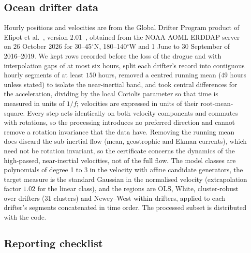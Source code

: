 \subsection{Ocean drifter data}
\label{sec:driftermethods}

Hourly positions and velocities are from the Global Drifter Program product of
Elipot et al.~\citep{elipot2016global}, version 2.01~\citep{elipot2022hourly}, obtained from
the NOAA AOML ERDDAP server on 26 October 2026 for 30--45$^\circ$N,
180--140$^\circ$W and 1 June to 30 September of 2016--2019. We kept rows
recorded before the loss of the drogue and with interpolation gaps of at most
six hours, split each drifter's record into contiguous hourly segments of at
least $150$ hours, removed a centred running mean ($49$ hours unless stated) to
isolate the near-inertial band, and took central differences for the
acceleration, dividing by the local Coriolis parameter so that time is measured
in units of $1/f$; velocities are expressed in units of their root-mean-square.
Every step acts identically on both velocity components and commutes with
rotations, so the processing introduces no preferred direction and cannot
remove a rotation invariance that the data have. Removing the running mean
does discard the sub-inertial flow (mean, geostrophic and Ekman currents),
which need not be rotation invariant, so the certificate concerns the dynamics
of the high-passed, near-inertial velocities, not of the full flow. The model classes are polynomials of degree 1 to 3 in the velocity
with affine candidate generators, the target measure is the standard Gaussian
in the normalised velocity (extrapolation factor $1.02$ for the linear class),
and the regions are OLS, White, cluster-robust over drifters ($31$ clusters)
and Newey--West within drifters, applied to each drifter's segments
concatenated in time order. The processed subset is distributed with the
code.

\subsection{Reporting checklist}
\label{sec:checklist}


